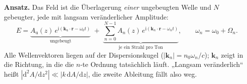 \documentclass[11pt,a4paper]{article}
\begin{document}
\medskip
\noindent\textbf{Ansatz.} Das Feld ist die Überlagerung \emph{einer}
ungebeugten Welle und $N$ gebeugter, jede mit langsam veränderlicher
Amplitude:
\begin{equation}
  E = \underbrace{A_\mathrm{u}(z)\,
        e^{\mathrm{i}(\mathbf{k}_\mathrm{u}\cdot\mathbf{r}-\omega_0 t)}}_{
        \text{ungebeugt}}
    \;+\; \underbrace{\sum_{n=0}^{N-1} A_n(z)\,
        e^{\mathrm{i}(\mathbf{k}_n\cdot\mathbf{r}-\omega_n t)}}_{
        \text{je ein Strahl pro Ton}} ,
  \qquad
  \omega_n = \omega_0 + \Omega_n .
  \label{eq:ansatz}
\end{equation}
Alle Wellenvektoren liegen auf der Dispersionskugel
($|\mathbf{k}_n| = n_0\omega_n/c$); $\mathbf{k}_n$ zeigt in die Richtung, in
die die $n$-te Ordnung tatsächlich läuft. „Langsam veränderlich`` heißt
$|\mathrm{d}^2A/\mathrm{d}z^2| \ll |k\,\mathrm{d}A/\mathrm{d}z|$, die
zweite Ableitung fällt also weg.

\medskip
\noindent{}
\end{document}
